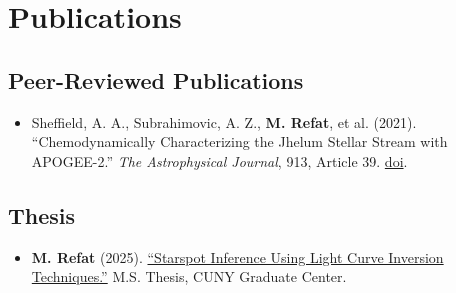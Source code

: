 
\section{Publications}

\subsection*{Peer-Reviewed Publications}
\begin{itemize}[leftmargin=1.2em,label={--},itemsep=2pt,topsep=2pt]
  \item Sheffield, A. A., Subrahimovic, A. Z., \textbf{M. Refat}, et al. (2021).
  ``Chemodynamically Characterizing the Jhelum Stellar Stream with APOGEE-2.''
  \textit{The Astrophysical Journal}, 913, Article 39.
  \href{https://doi.org/10.3847/1538-4357/abee93}{doi}.
\end{itemize}

\subsection*{Thesis}
\begin{itemize}[leftmargin=1.2em,label={--},itemsep=2pt,topsep=2pt]
  \item \textbf{M. Refat} (2025).
  \href{https://academicworks.cuny.edu/gc_etds/6480/}{
    ``Starspot Inference Using Light Curve Inversion Techniques.''}
  M.S. Thesis, CUNY Graduate Center.
\end{itemize}
